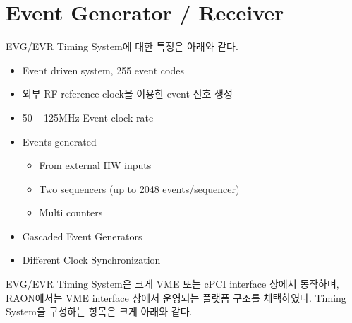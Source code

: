 \documentclass[11pt
  , a4paper
  , article
  , oneside
]{memoir}
\begin{document}
\section{Event Generator / Receiver}
EVG/EVR Timing System에 대한 특징은 아래와 같다.

\begin{itemize}
	\item Event driven system, 255 event codes
	\item 외부 RF reference clock을 이용한 event 신호 생성
	\item 50 ~ 125MHz Event clock rate
	\item Events generated
	\begin{itemize}
		\item From external HW inputs
		\item Two sequencers (up to 2048 events/sequencer)
		\item Multi counters
	\end{itemize}
	\item Cascaded Event Generators
	\item Different Clock Synchronization
\end{itemize}
EVG/EVR Timing System은 크게 VME 또는 cPCI interface 상에서 동작하며, RAON에서는 VME interface 상에서 운영되는 플랫폼 구조를 채택하였다. Timing System을 구성하는 항목은 크게 아래와 같다.





\clearpage


\end{document}
